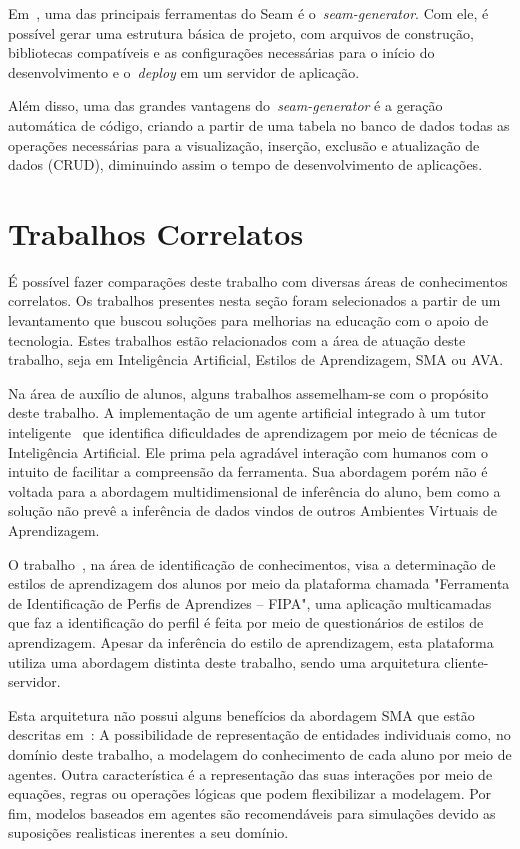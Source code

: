 Em~\cite{allen09}, uma das principais ferramentas do Seam é o~\emph{seam-generator}. Com ele, é possível gerar uma estrutura básica de projeto, com arquivos de construção, bibliotecas compatíveis e as configurações necessárias para o início do desenvolvimento e o~\emph{deploy} em um servidor de aplicação.

Além disso, uma das grandes vantagens do~\emph{seam-generator} é a geração automática de código, criando a partir de uma tabela no banco de dados todas as operações necessárias para a visualização, inserção, exclusão e atualização de dados (CRUD), diminuindo assim o tempo de desenvolvimento de aplicações.

\section{Trabalhos Correlatos}
É possível fazer comparações deste trabalho com diversas áreas de conhecimentos correlatos. Os trabalhos presentes nesta seção foram selecionados a partir de um levantamento que buscou soluções para melhorias na educação com o apoio de tecnologia. Estes trabalhos estão relacionados com a área de atuação deste trabalho, seja em Inteligência Artificial, Estilos de Aprendizagem, SMA ou AVA.

Na área de auxílio de alunos, alguns trabalhos assemelham-se com o propósito deste trabalho. A implementação de um agente artificial integrado à um tutor inteligente~\cite{soaresagente} que identifica dificuldades de aprendizagem por meio de técnicas de Inteligência Artificial. Ele prima pela agradável interação com humanos com o intuito de facilitar a compreensão da ferramenta. Sua abordagem porém não é voltada para a abordagem multidimensional de inferência do aluno, bem como a solução não prevê a inferência de dados vindos de outros Ambientes Virtuais de Aprendizagem.

O trabalho~\cite{bativa2011}, na área de identificação de conhecimentos, visa a determinação de estilos de aprendizagem dos alunos por meio da plataforma chamada "Ferramenta de Identificação de Perfis de Aprendizes – FIPA", uma aplicação multicamadas que faz a identificação do perfil é feita por meio de questionários de estilos de aprendizagem. Apesar da inferência do estilo de aprendizagem, esta plataforma utiliza uma abordagem distinta deste trabalho, sendo uma arquitetura cliente-servidor. 

Esta arquitetura não possui alguns benefícios da abordagem SMA que estão descritas em~\cite{helbing11}: A possibilidade de representação de entidades individuais como, no domínio  deste trabalho, a modelagem do conhecimento de cada aluno por meio de agentes. Outra característica é  a representação das suas interações por meio de equações, regras ou operações lógicas que podem flexibilizar a modelagem. Por fim, modelos baseados em agentes são recomendáveis para simulações devido as suposições realisticas inerentes a seu domínio.

